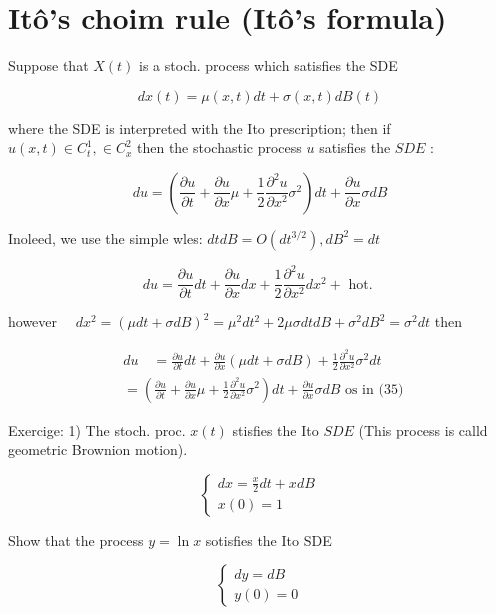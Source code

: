 \section*{Itô's choim rule (Itô's formula)}
Suppose that $X(t)$ is a stoch. process which satisfies the SDE

$$
 d x(t)=\mu(x, t) d t+\sigma(x, t) d B(t)
$$ 

where the SDE is interpreted with the Ito prescription; then if $u(x, t) \in C_{t}^{1}, \in C_{x}^{2}$ then the stochastic process $u$ satisfies the $S D E$ :


\begin{equation*}
d u=\left(\frac{\partial u}{\partial t}+\frac{\partial u}{\partial x} \mu+\frac{1}{2} \frac{\partial^{2} u}{\partial x^{2}} \sigma^{2}\right) d t+\frac{\partial u}{\partial x} \sigma d B \tag{35}
\end{equation*}

Inoleed, we use the simple wles: $d t d B=O
\left(d t^{3 / 2}\right), d B^{2}=d t$

$$
 d u=\frac{\partial u}{\partial t} d t+\frac{\partial u}{\partial x} d x+\frac{1}{2} \frac{\partial^{2} u}{\partial x^{2}} d x^{2}+\text{ hot. }
$$ 

however $\quad d x^{2}=(\mu d t+\sigma d B)^{2}=\mu^{2} d t^{2}+2 \mu \sigma d t d B+\sigma^{2} d B^{2}=\sigma^{2} d t$
then

$$
 \begin{aligned}
& d u \quad=\frac{\partial u}{\partial t} d t+\frac{\partial u}{\partial x}(\mu d t+\sigma d B)+\frac{1}{2} \frac{\partial^{2} u}{\partial x^{2}} \sigma^{2} d t \\
& =\left(\frac{\partial u}{\partial t}+\frac{\partial u}{\partial x} \mu+\frac{1}{2} \frac{\partial^{2} u}{\partial x^{2}} \sigma^{2}\right) d t+\frac{\partial u}{\partial x} \sigma d B \text{ os in (35) }
\end{aligned}
$$ 

Exercige: 1) The stoch. proc. $x(t)$ stisfies the Ito $S D E$ (This process is calld geometric Brownion motion).

$$
 \left\{
\begin{array}{l}
 d x=\frac{x}{2} d t+x d B \\
x(0)=1
\end{array}\right.
$$ 

Show that the process $y=\ln x$ sotisfies the Ito SDE

$$
 \left\{
\begin{array}{l}
 d y=d B \\
y(0)=0
\end{array}\right.
$$ 

